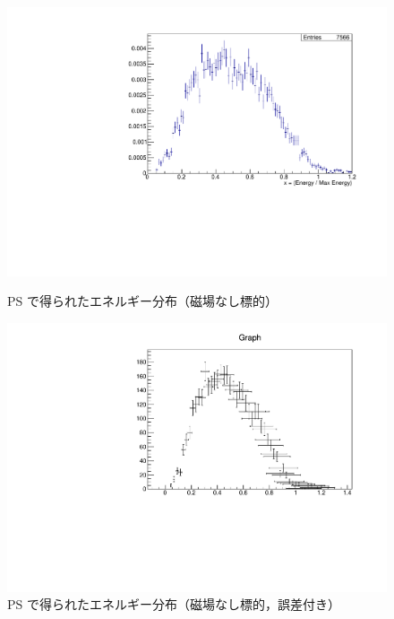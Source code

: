 \begin{figure}[H]
\centering
\begin{minipage}{0.4\columnwidth}
\centering
\includegraphics[height=\columnwidth,angle=-90]{figure/ikemitsu/michel_PS.pdf}
\caption{PS で得られたエネルギー分布（磁場なし標的）}
\label{michel_PS}    
\end{minipage} 
\begin{minipage}{0.4\columnwidth}
\centering
\includegraphics[height=\columnwidth,angle=-90]{figure/ikemitsu/michel_PS_gosa.pdf}
\caption{PS で得られたエネルギー分布（磁場なし標的，誤差付き）}
\label{michel_PS_gosa} 
\end{minipage}
\end{figure}
  
